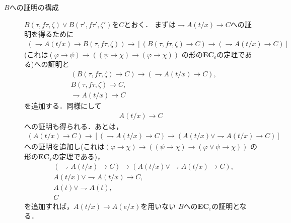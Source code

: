 \begin{description}
		\item[$B$への証明の構成]
			$B(\tau,f\tau,\zeta) \vee B(\tau',f\tau',\zeta')$を$C$とおく．
			まずは$\rightharpoondown A(t/x) \rightarrow C$への証明を得るために
			\begin{align}
				(\rightharpoondown A(t/x) \rightarrow B(\tau,f\tau,\zeta))
				\rightarrow [(B(\tau,f\tau,\zeta) \rightarrow C)
				\rightarrow (\rightharpoondown A(t/x) \rightarrow C)]
			\end{align}
			(これは$(\varphi \rightarrow \psi) \rightarrow
			((\psi \rightarrow \chi) \rightarrow (\varphi \rightarrow \chi))$
			の形の{\bf EC}${}_{\varepsilon}$の定理である)への証明と
			\begin{align}
				&(B(\tau,f\tau,\zeta) \rightarrow C)
					\rightarrow (\rightharpoondown A(t/x) \rightarrow C), \\
				&B(\tau,f\tau,\zeta) \rightarrow C, \\
				&\rightharpoondown A(t/x) \rightarrow C
			\end{align}
			を追加する．同様にして
			\begin{align}
				A(t/x) \rightarrow C
			\end{align}
			への証明も得られる．あとは，
			\begin{align}
				(A(t/x) \rightarrow C) \rightarrow
				\left[ (\rightharpoondown A(t/x) \rightarrow C) \rightarrow
				(A(t/x) \vee \rightharpoondown A(t/x) \rightarrow C)\right]
			\end{align}
			への証明を追加し(これは$(\varphi \rightarrow \chi) \rightarrow
			((\psi \rightarrow \chi) \rightarrow 
			(\varphi \vee \psi \rightarrow \chi))$
			の形の{\bf EC}${}_{\varepsilon}$の定理である)，
			\begin{align}
				&(\rightharpoondown A(t/x) \rightarrow C) \rightarrow
				(A(t/x) \vee \rightharpoondown A(t/x) \rightarrow C), \\
				&A(t/x) \vee \rightharpoondown A(t/x) \rightarrow C, \\
				&A(t) \vee \rightharpoondown A(t), \\
				&C
			\end{align}
			を追加すれば，$A(t/x) \rightarrow A(e/x)$を用いない
			$B$への{\bf EC}${}_{\varepsilon}$の証明となる．
			\QED
	\end{description}